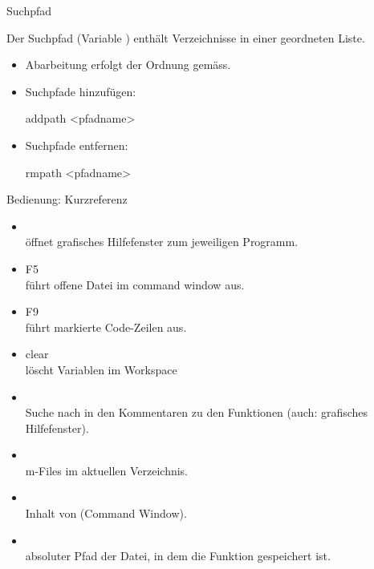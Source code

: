 \documentclass[hyperref={xetex}]{beamer}
\begin{document}
\begin{frame}[fragile]{Suchpfad}

Der Suchpfad (Variable ) enthält Verzeichnisse in einer geordneten Liste.

\begin{itemize}
\item Abarbeitung erfolgt der Ordnung gemäss.
\item  Suchpfade hinzufügen:
\begin{matlabin}
addpath <pfadname>
\end{matlabin}
\item Suchpfade entfernen:
\begin{matlabin}
rmpath <pfadname>
\end{matlabin}
\end{itemize}
\end{frame}


\begin{frame}[fragile]{Bedienung: Kurzreferenz}
\begin{itemize}
\item \alert{ }\\ öffnet grafisches Hilfefenster zum jeweiligen Programm.
  \item \alert{F5}\\ führt offene Datei im command window aus.
  \item \alert{F9}\\ führt markierte Code-Zeilen aus.
  \item \alert{clear}\\ löscht Variablen im Workspace
\item \alert{ } \\ Suche nach  in den
  Kommentaren zu den Funktionen (auch: grafisches Hilfefenster).
\item  \alert{ }\\ m-Files im aktuellen Verzeichnis.
\item  \alert{ }\\ Inhalt von  (Command Window).
\item  \alert{ }\\ absoluter Pfad der Datei, in dem die  Funktion
   gespeichert ist. 
\end{itemize}
\end{frame}
\end{document}
